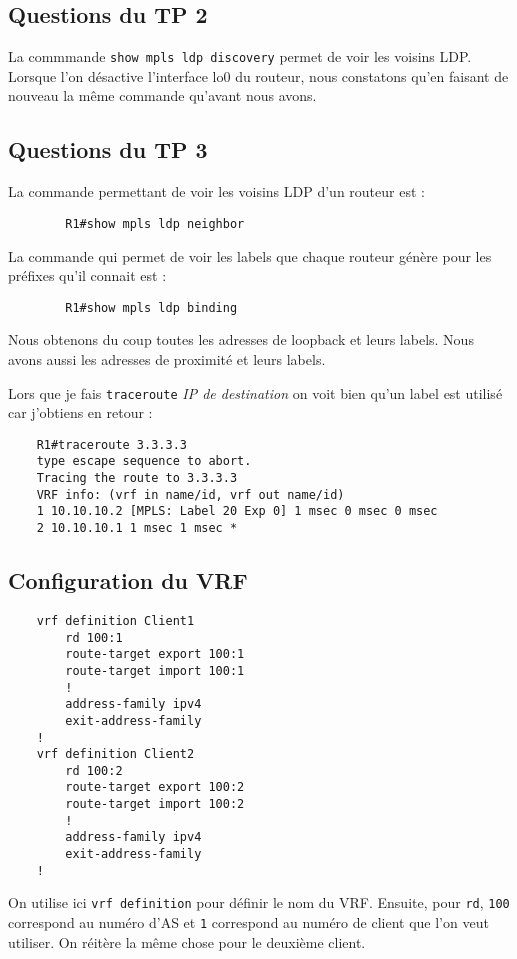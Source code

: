 \documentclass[12pt, a4paper]{article}
\begin{document}
\subsection{Questions du TP 2}
La commmande \texttt{show mpls ldp discovery} permet de voir les voisins LDP. 
Lorsque l'on désactive l'interface lo0 du routeur, nous constatons qu'en faisant
de nouveau la même commande qu'avant nous avons. 

\newpage

\subsection{Questions du TP 3}
La commande permettant de voir les voisins LDP d'un routeur est :
    \begin{verbatim}
        R1#show mpls ldp neighbor
    \end{verbatim}

La commande qui permet de voir les labels que chaque routeur génère pour 
les préfixes qu’il connait est : 
    \begin{verbatim}
        R1#show mpls ldp binding
    \end{verbatim}
Nous obtenons du coup toutes les adresses de loopback et leurs labels.
Nous avons aussi les adresses de proximité et leurs labels.



Lors que je fais \texttt{traceroute} \textit{IP de destination} on voit bien
qu'un label est utilisé car j'obtiens en retour : 
\begin{verbatim}
    R1#traceroute 3.3.3.3
    type escape sequence to abort.
    Tracing the route to 3.3.3.3
    VRF info: (vrf in name/id, vrf out name/id)
    1 10.10.10.2 [MPLS: Label 20 Exp 0] 1 msec 0 msec 0 msec
    2 10.10.10.1 1 msec 1 msec *
\end{verbatim}


\newpage
\subsection{Configuration du VRF}
\begin{verbatim}
    vrf definition Client1
        rd 100:1
        route-target export 100:1
        route-target import 100:1
        !
        address-family ipv4
        exit-address-family
    !
    vrf definition Client2
        rd 100:2
        route-target export 100:2
        route-target import 100:2
        !
        address-family ipv4
        exit-address-family
    !
\end{verbatim}
On utilise ici \texttt{vrf definition} pour définir le nom du VRF. 
Ensuite, pour \texttt{rd}, \texttt{100} correspond au numéro d'AS et \texttt{1}
correspond au numéro de client que l'on veut utiliser. On réitère la même 
chose pour le deuxième client.
\end{document}
